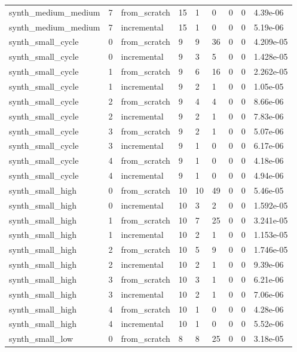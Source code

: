 \begin{table}[t]
\begin{tabular}{lllllllll}
synth\_medium\_medium & 7 & from\_scratch & 15 & 1 & 0 & 0 & 0 & 4.39e-06 \\
synth\_medium\_medium & 7 & incremental & 15 & 1 & 0 & 0 & 0 & 5.19e-06 \\
synth\_small\_cycle & 0 & from\_scratch & 9 & 9 & 36 & 0 & 0 & 4.209e-05 \\
synth\_small\_cycle & 0 & incremental & 9 & 3 & 5 & 0 & 0 & 1.428e-05 \\
synth\_small\_cycle & 1 & from\_scratch & 9 & 6 & 16 & 0 & 0 & 2.262e-05 \\
synth\_small\_cycle & 1 & incremental & 9 & 2 & 1 & 0 & 0 & 1.05e-05 \\
synth\_small\_cycle & 2 & from\_scratch & 9 & 4 & 4 & 0 & 0 & 8.66e-06 \\
synth\_small\_cycle & 2 & incremental & 9 & 2 & 1 & 0 & 0 & 7.83e-06 \\
synth\_small\_cycle & 3 & from\_scratch & 9 & 2 & 1 & 0 & 0 & 5.07e-06 \\
synth\_small\_cycle & 3 & incremental & 9 & 1 & 0 & 0 & 0 & 6.17e-06 \\
synth\_small\_cycle & 4 & from\_scratch & 9 & 1 & 0 & 0 & 0 & 4.18e-06 \\
synth\_small\_cycle & 4 & incremental & 9 & 1 & 0 & 0 & 0 & 4.94e-06 \\
synth\_small\_high & 0 & from\_scratch & 10 & 10 & 49 & 0 & 0 & 5.46e-05 \\
synth\_small\_high & 0 & incremental & 10 & 3 & 2 & 0 & 0 & 1.592e-05 \\
synth\_small\_high & 1 & from\_scratch & 10 & 7 & 25 & 0 & 0 & 3.241e-05 \\
synth\_small\_high & 1 & incremental & 10 & 2 & 1 & 0 & 0 & 1.153e-05 \\
synth\_small\_high & 2 & from\_scratch & 10 & 5 & 9 & 0 & 0 & 1.746e-05 \\
synth\_small\_high & 2 & incremental & 10 & 2 & 1 & 0 & 0 & 9.39e-06 \\
synth\_small\_high & 3 & from\_scratch & 10 & 3 & 1 & 0 & 0 & 6.21e-06 \\
synth\_small\_high & 3 & incremental & 10 & 2 & 1 & 0 & 0 & 7.06e-06 \\
synth\_small\_high & 4 & from\_scratch & 10 & 1 & 0 & 0 & 0 & 4.28e-06 \\
synth\_small\_high & 4 & incremental & 10 & 1 & 0 & 0 & 0 & 5.52e-06 \\
synth\_small\_low & 0 & from\_scratch & 8 & 8 & 25 & 0 & 0 & 3.18e-05 \\

\end{tabular}
\end{table}
